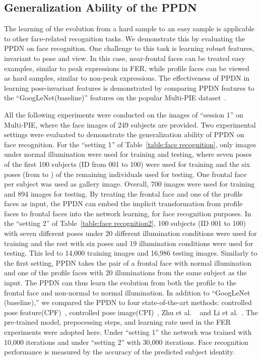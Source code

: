 \documentclass[runningheads]{llncs}
\begin{document}
\subsection{Generalization Ability of the PPDN}

The learning of the evolution from a hard sample to an 
easy sample is applicable to other face-related recognition 
tasks. We demonstrate this by evaluating the PPDN on face recognition. One 
challenge to this task is learning robust features,
invariant to pose and view. In this case,
near-frontal faces can be treated easy examples, similar to peak expressions 
in FER, while profile faces can be viewed as hard samples, similar to 
non-peak expressions. The effectiveness of PPDN in learning
pose-invariant features is demonstrated by comparing PPDN features
to the ``GoogLeNet(baseline)'' features on the popular Multi-PIE 
dataset~\cite{gross2010multi}. 

All the following experiments were conducted on the images of ``session 1''
on Multi-PIE, where the face images of 249 subjects are provided. Two 
experimental settings were evaluated to demonstrate the generalization 
ability of PPDN on face recognition. For the ``setting 1'' of 
Table~\ref{table:face recognition}, only images under normal illumination 
were used for training and testing, where  seven poses of the first 
100 subjects (ID from 001 to 100) were used for training and the
six poses (from  to  ) of the remaining individuals
used for testing. One frontal face per subject was used as gallery image. 
Overall, 700 images were used for training and 894 images for testing. 
By treating the frontal face and one of the profile faces as input, the 
PPDN can embed the implicit transformation from profile faces to frontal faces 
into the network learning, for face recognition purposes. In the
``setting 2'' of Table~\ref{table:face recognition2}, 100 subjects 
(ID 001 to 100) with seven different poses under 20 different illumination 
conditions were used for training and the rest with six poses and 
19 illumination conditions were used for testing. This led to 14,000 training
images and 16,986 testing images. Similarly to the first setting, PPDN takes 
the pair of a frontal face with normal illumination and one of the profile 
faces with 20 illuminations from the same subject as the input. 
The PPDN can thus learn the evolution from both the profile to the frontal 
face and non-normal to normal illumination. In addition to 
``GoogLeNet (baseline),'' we compared the PPDN to four state-of-the-art 
methods: controlled pose feature(CPF)~\cite{yim2015rotating}, controlled pose 
image(CPI)~\cite{yim2015rotating}, Zhu et al. ~\cite{zhu2013deep} and Li et 
al.~\cite{li2012coupled}. The pre-trained model, prepocessing steps, and 
learning rate used in the FER experiments were adopted here. Under 
``setting 1'' the network was trained with 10,000 iterations and under 
``setting 2'' with 30,000 iterations. Face recognition performance is 
measured by the accuracy of the predicted subject identity.
\end{document}
